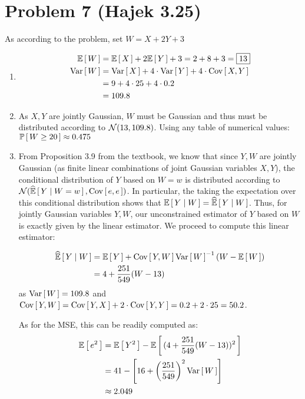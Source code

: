 \documentclass[12pt]{article}%
\begin{document}
\section{Problem 7 (Hajek 3.25)}
As according to the problem, set $W = X + 2Y + 3$
\begin{enumerate}
  \item
  \begin{align}
    \mathbb{E}\left[\,W\,\right] & = \mathbb{E}\left[\,X\,\right] + 2\mathbb{E}\left[\,Y\,\right] + 3 = 2 + 8 + 3 = \boxed{13} \\
    \text{Var}\left[\,W\,\right] & = \text{Var}\left[\,X\,\right] + 4\cdot\text{Var}\left[\,Y\,\right] + 4\cdot\text{Cov}\left[\,X,Y\,\right] \\
    & = 9 + 4\cdot 25 + 4 \cdot 0.2 \\
    & = 109.8
  \end{align}

  \item
  As $X,Y$ are jointly Gaussian, $W$ must be Gaussian and thus must be distributed according to $\mathcal{N}(13,109.8)$. Using any table of numerical values:
  $\mathbb{P}\left[\,W \geq 20\,\right] \approx 0.475$

  \item
  From Proposition 3.9 from the textbook, we know that since $Y,W$ are jointly Gaussian (as finite linear combinations of joint Gaussian variables $X,Y$), the conditional distribution of $Y$ based on $W = w$ is distributed according to $\mathcal{N}(\widehat{ \mathbb{E}}\left[\,{Y} \mid {W = w}\,\right],\text{Cov}\left[\,e,e\,\right])$. In particular, the taking the expectation over this conditional distribution shows that $\mathbb{E}\left[\,{Y}\mid {W}\,\right] = \widehat{ \mathbb{E}}\left[\,{Y} \mid {W}\,\right]$. Thus, for jointly Gaussian variables $Y,W$, our unconstrained estimator of $Y$ based on $W$ is exactly given by the linear estimator. We proceed to compute this linear estimator:

  \begin{align*}
    \widehat{ \mathbb{E}}\left[\,{Y} \mid {W}\,\right] & = \mathbb{E}\left[\,Y\,\right] + \text{Cov}\left[\,Y,W\,\right]\text{Var}\left[\,W\,\right]^{-1}\left(W - \mathbb{E}\left[\,W\,\right]\right) \\
    & = 4  + \frac{251}{549}(W - 13)
  \end{align*}
  as $\text{Var}\left[\,W\,\right] = 109.8$ and $\text{Cov}\left[\,Y,W\,\right] = \text{Cov}\left[\,Y,X\,\right] + 2\cdot \text{Cov}\left[\,Y,Y\,\right] = 0.2 + 2 \cdot 25 = 50.2$.

  As for the MSE, this can be readily computed as:
  \begin{align*}
    \mathbb{E}\left[\,e^2\,\right] & = \mathbb{E}\left[\,Y^2\,\right] - \mathbb{E}\left[\,(4 +  \frac{251}{549}(W - 13))^2\,\right] \\
    & = 41 - \left[16 +  \left(\frac{251}{549}\right)^2\text{Var}\left[\,W\,\right]\right] \\
    & \approx 2.049
  \end{align*}
\end{enumerate}
\end{document}
